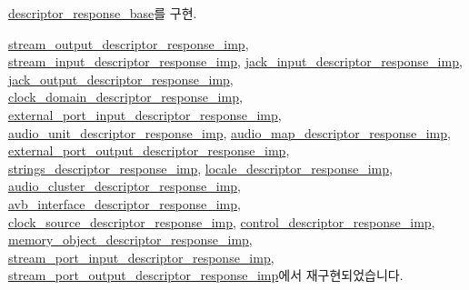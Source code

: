 \hyperlink{classavdecc__lib_1_1descriptor__response__base_a133f7774946d80f82b8aaaa4cfbb7361}{descriptor\+\_\+response\+\_\+base}를 구현.



\hyperlink{classavdecc__lib_1_1stream__output__descriptor__response__imp_a15837e3eb254ad44812cb766ae8cd53c}{stream\+\_\+output\+\_\+descriptor\+\_\+response\+\_\+imp}, \hyperlink{classavdecc__lib_1_1stream__input__descriptor__response__imp_a15837e3eb254ad44812cb766ae8cd53c}{stream\+\_\+input\+\_\+descriptor\+\_\+response\+\_\+imp}, \hyperlink{classavdecc__lib_1_1jack__input__descriptor__response__imp_a15837e3eb254ad44812cb766ae8cd53c}{jack\+\_\+input\+\_\+descriptor\+\_\+response\+\_\+imp}, \hyperlink{classavdecc__lib_1_1jack__output__descriptor__response__imp_a15837e3eb254ad44812cb766ae8cd53c}{jack\+\_\+output\+\_\+descriptor\+\_\+response\+\_\+imp}, \hyperlink{classavdecc__lib_1_1clock__domain__descriptor__response__imp_a15837e3eb254ad44812cb766ae8cd53c}{clock\+\_\+domain\+\_\+descriptor\+\_\+response\+\_\+imp}, \hyperlink{classavdecc__lib_1_1external__port__input__descriptor__response__imp_a15837e3eb254ad44812cb766ae8cd53c}{external\+\_\+port\+\_\+input\+\_\+descriptor\+\_\+response\+\_\+imp}, \hyperlink{classavdecc__lib_1_1audio__unit__descriptor__response__imp_a15837e3eb254ad44812cb766ae8cd53c}{audio\+\_\+unit\+\_\+descriptor\+\_\+response\+\_\+imp}, \hyperlink{classavdecc__lib_1_1audio__map__descriptor__response__imp_a15837e3eb254ad44812cb766ae8cd53c}{audio\+\_\+map\+\_\+descriptor\+\_\+response\+\_\+imp}, \hyperlink{classavdecc__lib_1_1external__port__output__descriptor__response__imp_a15837e3eb254ad44812cb766ae8cd53c}{external\+\_\+port\+\_\+output\+\_\+descriptor\+\_\+response\+\_\+imp}, \hyperlink{classavdecc__lib_1_1strings__descriptor__response__imp_a15837e3eb254ad44812cb766ae8cd53c}{strings\+\_\+descriptor\+\_\+response\+\_\+imp}, \hyperlink{classavdecc__lib_1_1locale__descriptor__response__imp_a15837e3eb254ad44812cb766ae8cd53c}{locale\+\_\+descriptor\+\_\+response\+\_\+imp}, \hyperlink{classavdecc__lib_1_1audio__cluster__descriptor__response__imp_a15837e3eb254ad44812cb766ae8cd53c}{audio\+\_\+cluster\+\_\+descriptor\+\_\+response\+\_\+imp}, \hyperlink{classavdecc__lib_1_1avb__interface__descriptor__response__imp_a15837e3eb254ad44812cb766ae8cd53c}{avb\+\_\+interface\+\_\+descriptor\+\_\+response\+\_\+imp}, \hyperlink{classavdecc__lib_1_1clock__source__descriptor__response__imp_a15837e3eb254ad44812cb766ae8cd53c}{clock\+\_\+source\+\_\+descriptor\+\_\+response\+\_\+imp}, \hyperlink{classavdecc__lib_1_1control__descriptor__response__imp_a15837e3eb254ad44812cb766ae8cd53c}{control\+\_\+descriptor\+\_\+response\+\_\+imp}, \hyperlink{classavdecc__lib_1_1memory__object__descriptor__response__imp_a15837e3eb254ad44812cb766ae8cd53c}{memory\+\_\+object\+\_\+descriptor\+\_\+response\+\_\+imp}, \hyperlink{classavdecc__lib_1_1stream__port__input__descriptor__response__imp_a15837e3eb254ad44812cb766ae8cd53c}{stream\+\_\+port\+\_\+input\+\_\+descriptor\+\_\+response\+\_\+imp}, \hyperlink{classavdecc__lib_1_1stream__port__output__descriptor__response__imp_a15837e3eb254ad44812cb766ae8cd53c}{stream\+\_\+port\+\_\+output\+\_\+descriptor\+\_\+response\+\_\+imp}에서 재구현되었습니다.



